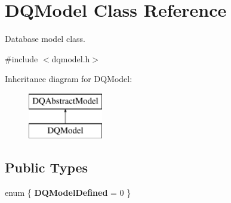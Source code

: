 \hypertarget{classDQModel}{
\section{DQModel Class Reference}
\label{classDQModel}
}


Database model class.  




{\ttfamily \#include $<$dqmodel.h$>$}

Inheritance diagram for DQModel:\begin{figure}[H]
\begin{center}
\leavevmode
\includegraphics[height=2.000000cm]{classDQModel}
\end{center}
\end{figure}
\subsection*{Public Types}
\begin{DoxyCompactItemize}
\item 
enum \{ {\bfseries DQModelDefined} =  0
 \}
\end{DoxyCompactItemize}

